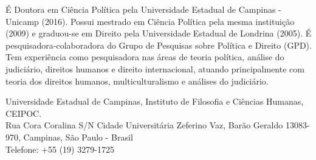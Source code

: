 
\begin{cvparagraph}

É Doutora em Ciência Política pela Universidade Estadual de Campinas - Unicamp (2016). Possui mestrado em Ciência Política pela mesma instituição (2009) e graduou-se em Direito pela Universidade Estadual de Londrina (2005). É pesquisadora-colaboradora do Grupo de Pesquisas sobre Política e Direito (GPD). Tem experiência como pesquisadora nas áreas de teoria política, análise do judiciário, direitos humanos e direito internacional, atuando principalmente com teoria dos direitos humanos, multiculturalismo e análises do judiciário.

\end{cvparagraph}


\begin{cvparagraph}
Universidade Estadual de Campinas, Instituto de Filosofia e Ciências Humanas, CEIPOC.\\
Rua Cora Coralina S/N Cidade Universitária Zeferino Vaz, Barão Geraldo 13083-970, Campinas, São Paulo - Brasil\\
Telefone: +55 (19) 3279-1725

\end{cvparagraph}
